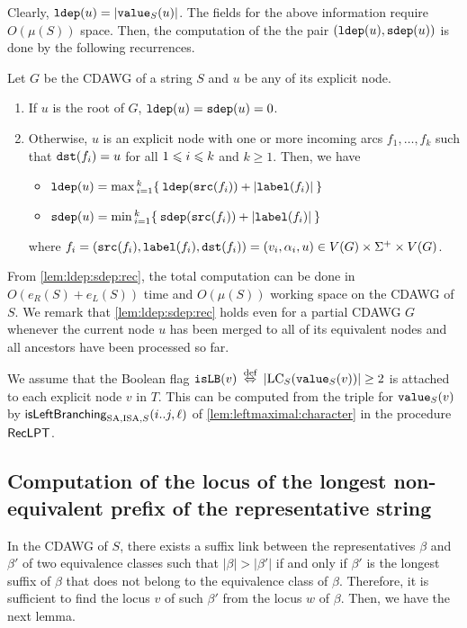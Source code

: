 Clearly, $\ldep(u) = |\Value(u)|$.
The fields for the above information require $O(\mu(S))$ space. 
Then, the computation of the the pair $(\op{ldep}(u), \sdep(u))$ is done by the following recurrences. 
\begin{lemma}\label{lem:ldep:sdep:rec}
Let $G$ be the CDAWG  of a string $S$ and $u$ be any of its explicit node. 
\begin{enumerate}
\item If $u$ is the root of $G$, $\ldep(u) = \sdep(u) = 0$. 
  
\item Otherwise, $u$ is an explicit node with one or more incoming arcs $f_1, \dots, f_k$ such that $\dst(f_i) = u$ for all $\btw i1k$ and $k\ge 1$.
Then, we have 
  \begin{itemize}
  \item $\ldep(u) = \max{}\idx i1k \{\: \ldep(\src(f_i)) + |\lab(f_i)|  \:\}$
  \item $\sdep(u) = \min{}\idx i1k \{\: \sdep(\src(f_i)) + |\lab(f_i)|  \:\}$
  \end{itemize}
  where $f_i = (\src(f_i), \lab(f_i), \dst(f_i)) = (v_i, \alpha_i, u) \in V(G)\by\Sigma^+\by V(G)$. 
\end{enumerate}
\end{lemma}

From \cref{lem:ldep:sdep:rec}, the total computation can be done in $O(e_R(S)+e_L(S))$ time and $O(\mu(S))$ working space on the CDAWG of $S$. 
We remark that \cref{lem:ldep:sdep:rec} holds even for a partial CDAWG $G$ whenever the current node $u$ has been merged to all of its equivalent nodes and all ancestors have been processed so far.

  We assume that the Boolean flag $\op{isLB}(v) \iffdef |\LC(\Value(v))|\ge 2$ is attached to each explicit node $v$ in $T$. This can be  computed from the triple for $\Value(v)$ by $\isLeftBranching(i..j, \ell)$ of \cref{lem:leftmaximal:character} in the procedure $\RecLPT$. 



\subsection{Computation of the locus of the longest non-equivalent prefix of the representative string}
\label{sec:compute:cdawg:equiv:classes}
In the CDAWG of $S$, there exists a suffix link between the representatives $\beta$ and $\beta'$ of two equivalence classes such that $|\beta| > |\beta'|$ if and only if $\beta'$ is the longest suffix of $\beta$ that does not belong to the equivalence class of $\beta$.
Therefore, it is sufficient to find the locus $v$ of such $\beta'$ from the locus $w$ of $\beta$. Then, we have the next lemma. 


